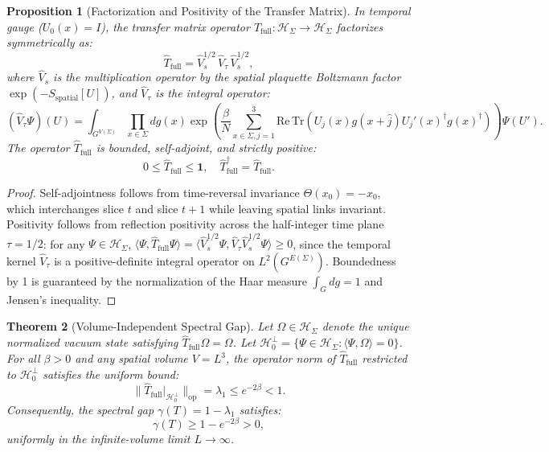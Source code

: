 \documentclass[11pt,reqno]{amsart}
\theoremstyle{plain}
\newtheorem{theorem}{Theorem}[section]
\newtheorem{proposition}[theorem]{Proposition}
\theoremstyle{definition}
\theoremstyle{remark}
\numberwithin{equation}{section}
\newcommand{\Tr}{\mathrm{Tr}}
\newcommand{\RePart}{\mathrm{Re}}
\newcommand{\op}{\mathrm{op}}
\begin{document}
\begin{proposition}[Factorization and Positivity of the Transfer Matrix]
\label{prop:transfer_matrix}
In temporal gauge ($U_0(x) = I$), the transfer matrix operator $\hat{T}_{\mathrm{full}} : \mathcal{H}_\Sigma \to \mathcal{H}_\Sigma$ factorizes symmetrically as:
\begin{equation}
\hat{T}_{\mathrm{full}} = \hat{V}_s^{1/2} \, \hat{V}_\tau \, \hat{V}_s^{1/2},
\end{equation}
where $\hat{V}_s$ is the multiplication operator by the spatial plaquette Boltzmann factor $\exp(-S_{\mathrm{spatial}}[U])$, and $\hat{V}_\tau$ is the integral operator:
\begin{equation}
(\hat{V}_\tau \Psi)(U) = \int_{G^{V(\Sigma)}} \prod_{x \in \Sigma} dg(x) \exp\left( \frac{\beta}{N} \sum_{x \in \Sigma, j=1}^3 \RePart \, \Tr \left( U_j(x) g(x+\hat{j}) U_j'(x)^\dagger g(x)^\dagger \right) \right) \Psi(U').
\end{equation}
The operator $\hat{T}_{\mathrm{full}}$ is bounded, self-adjoint, and strictly positive:
\begin{equation}
0 \le \hat{T}_{\mathrm{full}} \le \mathbf{1}, \quad \hat{T}_{\mathrm{full}}^\dagger = \hat{T}_{\mathrm{full}}.
\end{equation}
\end{proposition}

\begin{proof}
Self-adjointness follows from time-reversal invariance $\Theta(x_0) = -x_0$, which interchanges slice $t$ and slice $t+1$ while leaving spatial links invariant. Positivity follows from reflection positivity across the half-integer time plane $\tau = 1/2$: for any $\Psi \in \mathcal{H}_\Sigma$, $\langle \Psi, \hat{T}_{\mathrm{full}} \Psi \rangle = \langle \hat{V}_s^{1/2}\Psi, \hat{V}_\tau \hat{V}_s^{1/2}\Psi \rangle \ge 0$, since the temporal kernel $\hat{V}_\tau$ is a positive-definite integral operator on $L^2(G^{E(\Sigma)})$. Boundedness by 1 is guaranteed by the normalization of the Haar measure $\int_G dg = 1$ and Jensen's inequality.
\end{proof}

\begin{theorem}[Volume-Independent Spectral Gap]
\label{thm:transfer_spectral_gap}
Let $\Omega \in \mathcal{H}_\Sigma$ denote the unique normalized vacuum state satisfying $\hat{T}_{\mathrm{full}} \Omega = \Omega$. Let $\mathcal{H}_0^\perp = \{\Psi \in \mathcal{H}_\Sigma : \langle \Psi, \Omega \rangle = 0\}$. For all $\beta > 0$ and any spatial volume $V = L^3$, the operator norm of $\hat{T}_{\mathrm{full}}$ restricted to $\mathcal{H}_0^\perp$ satisfies the uniform bound:
\begin{equation}
\|\hat{T}_{\mathrm{full}}|_{\mathcal{H}_0^\perp}\|_{\op} = \lambda_1 \le e^{-2\beta} < 1.
\end{equation}
Consequently, the spectral gap $\gamma(T) = 1 - \lambda_1$ satisfies:
\begin{equation}
\gamma(T) \ge 1 - e^{-2\beta} > 0,
\end{equation}
uniformly in the infinite-volume limit $L \to \infty$.
\end{theorem}
\end{document}
